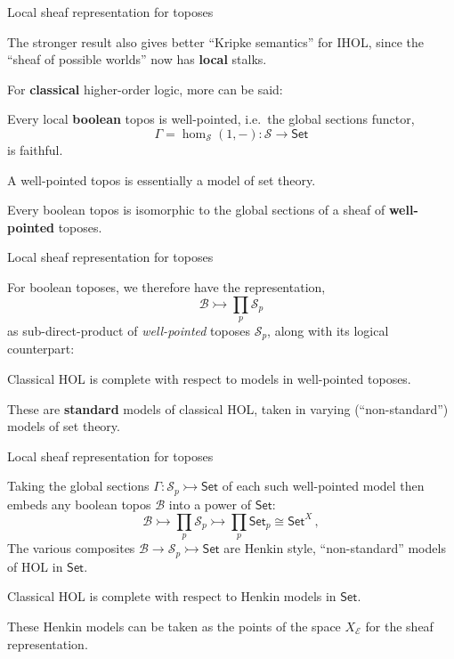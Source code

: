 \documentclass{beamer}
\newcommand{\E}{\ensuremath{\mathcal{E}}}
\newcommand{\myemph}[1]{\textbf{#1}}    %
\newcommand{\Set}{\mathsf{Set}}
\begin{document}
\begin{frame}{Local sheaf representation for toposes}

The stronger result also gives better ``Kripke semantics'' for IHOL, since the ``sheaf of possible worlds'' now has \myemph{local} stalks.
\medskip

For \myemph{classical} higher-order logic, more can be said:

\begin{lemma}
Every local \myemph{boolean} topos is well-pointed, i.e.\ the global sections functor,
\[
\Gamma = \hom_\mathcal{S}(1, - ) : \mathcal{S} \to \Set
\]
is faithful.
\end{lemma}

A well-pointed topos is essentially a model of set theory.  

\begin{corollary}
Every boolean topos is isomorphic to the global sections of a sheaf of \myemph{well-pointed} toposes.  
\end{corollary}

\end{frame}
\begin{frame}{Local sheaf representation for toposes}

For boolean toposes, we therefore have the  representation, 
\[
\mathcal{B} \rightarrowtail \prod_{p}\mathcal{S}_p 
\]
as sub-direct-product of \emph{well-pointed} toposes $\mathcal{S}_p$, along with its logical counterpart:
%
\begin{corollary}
Classical HOL is complete with respect to models in well-pointed toposes.
\end{corollary}
\medskip

These are \myemph{standard} models of classical HOL, taken in varying (``non-standard'') models of set theory.

\end{frame}
\begin{frame}{Local sheaf representation for toposes}


Taking the global sections $\Gamma:\mathcal{S}_p \rightarrowtail \Set$ of each such well-pointed model then embeds any boolean topos $\mathcal{B}$ into a power of $\Set$:
\[
\mathcal{B} \rightarrowtail \prod_{p}\mathcal{S}_p \rightarrowtail \prod_{p}\Set_p \cong \Set^X\,,
\]
The various composites $\mathcal{B} \rightarrow \mathcal{S}_p \rightarrowtail \Set$ are Henkin style, ``non-standard'' models of HOL in $\Set$.

\begin{corollary}
Classical HOL is complete with respect to Henkin models in $\Set$.
\end{corollary}
\medskip

These Henkin models can be taken as the points of the space $X_\E$ for the sheaf representation.

\end{frame}
\end{document}
